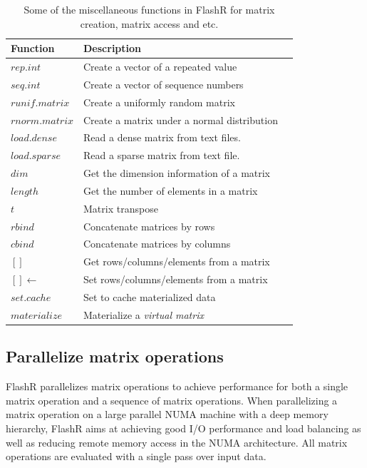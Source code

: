 \begin{table}
\begin{center}
\caption{Some of the miscellaneous functions in FlashR for matrix creation,
	matrix access and etc.}
\vspace{-10pt}
\footnotesize
\begin{tabular}{|l|l|l|}
\hline
Function & Description \\
\hline
$rep.int$ & Create a vector of a repeated value \\
$seq.int$ & Create a vector of sequence numbers \\
$runif.matrix$ & Create a uniformly random matrix  \\
$rnorm.matrix$ & Create a matrix under a normal distribution \\
\hline
$load.dense$ & Read a dense matrix from text files. \\
$load.sparse$ & Read a sparse matrix from text file. \\
\hline
$dim$ & Get the dimension information of a matrix\\
$length$ & Get the number of elements in a matrix\\
\hline
$t$ & Matrix transpose \\
$rbind$ & Concatenate matrices by rows \\
$cbind$ & Concatenate matrices by columns \\
$[]$ & Get rows/columns/elements from a matrix \\
$[]\gets$ & Set rows/columns/elements from a matrix \\
\hline
$set.cache$ & Set to cache materialized data \\
$materialize$ & Materialize a \textit{virtual matrix} \\
\hline
\end{tabular}
\normalsize
\label{tbl:utility}
\end{center}
\end{table}

\subsection{Parallelize matrix operations}

FlashR parallelizes matrix operations to achieve performance for both a single
matrix operation and a sequence of matrix operations. When parallelizing a matrix
operation on a large parallel NUMA machine with a deep memory hierarchy, FlashR
aims at achieving good
I/O performance and load balancing as well as reducing remote memory access
in the NUMA architecture. All matrix operations are evaluated with
a single pass over input data.

